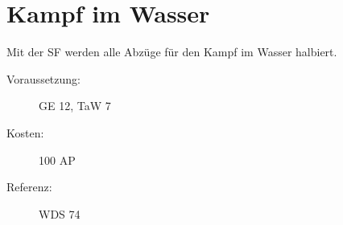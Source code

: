 \section{Kampf im Wasser}
\label{sf.kampf_im_wasser}
Mit der SF  werden alle Abzüge für den Kampf im Wasser halbiert.
\begin{description}
    \item[Voraussetzung:]
        GE 12, TaW  7
    \item [Kosten:]
        100 AP
    \item [Referenz:]
        WDS 74
\end{description}
